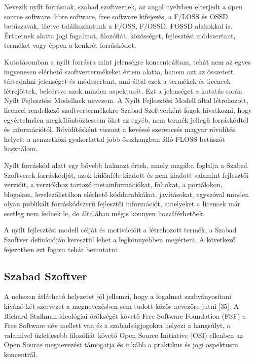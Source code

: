 \documentclass[12pt,magyar,a4paper,oneside]{scrreprt}
\begin{document}
Nevezik nyílt forrásnak, szabad szoftvernek, az angol nyelvben elterjedt
a open source software, libre software, free software kifejezés, a
F/LOSS és OSSD betűszavak, illetve találkozhatunk a F/OSS, F/OSSD, FOSSD
alakokkal is. Érthetnek alatta jogi fogalmat, filozófiát, közösséget,
fejlesztési módszertant, terméket vagy éppen a konkrét forráskódot.

Kutatásomban a nyílt forrásra mint jelenségre koncentráltam, tehát nem
az egyes ingyenesen elérhető szoftvertermékeket értem alatta, hanem azt
az összetett társadalmi jelenséget és módszertant, ami által ezek a
termékek és licencek létrejöttek, beleértve azok minden aspektusát. Ezt
a jelenséget a kutatás során Nyílt Fejlesztési Modellnek nevezem. A
Nyílt Fejlesztési Modell által létrehozott, licencel rendelkező
szoftvertermékekre Szabad Szoftverként fogok hivatkozni, hogy
egyértelműen megkülönböztessem őket az egyéb, nem termék jellegű
forráskódtól és információtól. Rövidítésként viszont a kevéssé
szerencsés magyar rövidítés helyett a nemzetközi gyakorlattal jobb
összhangban álló FLOSS betűszót használom.

Nyílt forráskód alatt egy bővebb halmazt értek, amely magába foglalja a
Szabad Szoftverek forráskódját, azok különféle kiadott és nem kiadott
valamint fejlesztői verzióit, a verziókhoz tartozó metainformációkat,
foltokat, a portálokon, blogokon, levelezőlistákon elérhető
kóddarabkákat, javításokat, egyszóval minden olyan publikált
forráskódszerű fejlesztői információt, amelyeket a licencek már esetleg
nem fednek le, de általában mégis könnyen hozzáférhetőek.

A nyílt fejlesztési modell célját és motivációit a létrehozott termék, a
Szabad Szoftver definícióján keresztül lehet a legkönnyebben megérteni.
A következő fejezetben ezt fogom tehát bemutatni.

\hypertarget{sec:FSF_PONTOK}{%
\subsection{Szabad Szoftver}\label{sec:FSF_PONTOK}}

A nehezen átlátható helyzetet jól jellemzi, hogy a fogalmat
szabványosítani kívánó két szervezet a megnevezésben sem tudott közös
nevezőre jutni {[}35{]}. A Richard Stallman ideológiai örökségét követő
Free Software Foundation (FSF) a Free Software név mellett van és a
szabadságjogokra helyezi a hangsúlyt, a valamivel üzletiesebb filozófiát
követő Open Source Initiative (OSI) ellenben az Open Source megnevezést
támogatja és inkább a praktikus és jogi aspektusra koncentrál.
\end{document}
